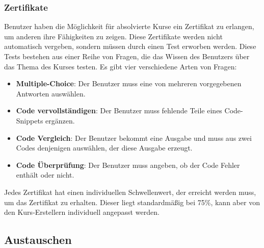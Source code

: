 \documentclass[main.tex]{subfiles}
\begin{document}
    \subsubsection{Zertifikate}
    Benutzer haben die Möglichkeit für absolvierte Kurse ein Zertifikat zu erlangen, um anderen ihre Fähigkeiten zu zeigen.
    Diese Zertifikate werden nicht automatisch vergeben, sondern müssen durch einen Test erworben werden.
    Diese Tests bestehen aus einer Reihe von Fragen, die das Wissen des Benutzers über das Thema des Kurses testen.
    Es gibt vier verschiedene Arten von Fragen:
    \begin{itemize}
        \item \textbf{Multiple-Choice}: Der Benutzer muss eine von mehreren vorgegebenen Antworten auswählen.
        \item \textbf{Code vervollständigen}: Der Benutzer muss fehlende Teile eines Code-Snippets ergänzen.
        \item \textbf{Code Vergleich}: Der Benutzer bekommt eine Ausgabe und muss aus zwei Codes denjenigen auswählen, der diese Ausgabe erzeugt.
        \item \textbf{Code Überprüfung}: Der Benutzer muss angeben, ob der Code Fehler enthält oder nicht.
    \end{itemize}
    Jedes Zertifikat hat einen individuellen Schwellenwert, der erreicht werden muss, um das Zertifikat zu erhalten.
    Dieser liegt standardmäßig bei 75\%, kann aber von den Kurs-Erstellern individuell angepasst werden.
    \subsection{Austauschen}
\end{document}
